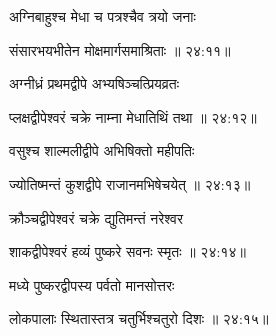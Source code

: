 {\devanagarifont अग्निबाहुश्च मेधा च पत्रश्चैव त्रयो जनाः \thinspace{\dandab} \dontdisplaylinenum }%


{\devanagarifont संसारभयभीतेन मोक्षमार्गसमाश्रिताः {॥ २४:११॥} \veg\dontdisplaylinenum }%

{\devanagarifont अग्नीध्रं प्रथमद्वीपे अभ्यषिञ्चत्प्रियव्रतः \thinspace{\dandab} \dontdisplaylinenum }%


{\devanagarifont प्लक्षद्वीपेश्वरं चक्रे नाम्ना मेधातिथिं तथा {॥ २४:१२॥} \veg\dontdisplaylinenum }%

{\devanagarifont वसुश्च शाल्मलीद्वीपे अभिषिक्तो महीपतिः \thinspace{\dandab} \dontdisplaylinenum }%


{\devanagarifont ज्योतिष्मन्तं कुशद्वीपे राजानमभिषेचयेत् {॥ २४:१३॥} \veg\dontdisplaylinenum }%
 
{\devanagarifont क्रौञ्चद्वीपेश्वरं चक्रे द्युतिमन्तं नरेश्वर \thinspace{\dandab} \dontdisplaylinenum }%


{\devanagarifont शाकद्वीपेश्वरं हव्यं पुष्करे सवनः स्मृतः {॥ २४:१४॥} \veg\dontdisplaylinenum }%

{\devanagarifont मध्ये पुष्करद्वीपस्य पर्वतो मानसोत्तरः \thinspace{\dandab} \dontdisplaylinenum }%
 

{\devanagarifont लोकपालाः स्थितास्तत्र चतुर्भिश्चतुरो दिशः {॥ २४:१५॥} \veg\dontdisplaylinenum }%

